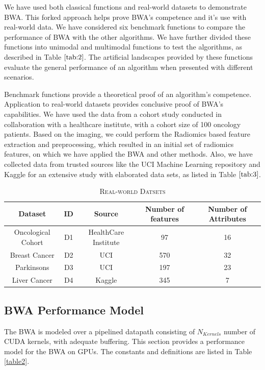 \documentclass[conference]{IEEEtran}
\begin{document}
We have used both classical functions and real-world datasets to demonstrate BWA. This forked approach helps prove BWA's competence and it's use with real-world data. We have considered six benchmark functions to compare the performance of BWA with the other algorithms. We have further divided these functions into unimodal and multimodal functions to test the algorithms, as described in Table $\ref{tab:2}$. The artificial landscapes provided by these functions evaluate the general performance of an algorithm when presented with different scenarios. 



Benchmark functions provide a theoretical proof of an algorithm's competence. Application to real-world datasets provides conclusive proof of BWA's capabilities. We have used the data from a cohort study conducted in collaboration with a healthcare institute, with a cohort size of 100 oncology patients. Based on the imaging, we could perform the Radiomics based feature extraction and preprocessing, which resulted in an initial set of radiomics features, on which we have applied the BWA and other methods. Also, we have collected data from trusted sources like the UCI Machine Learning repository and Kaggle for an extensive study with elaborated data sets, as listed in Table $\ref{tab:3}$. 

\begin{table}[t]
\caption{\textsc{Real-world Datsets}}
\label{tab:3}
\centering
\scalebox{0.75}
{
\begin{tabular}{ | c | c | c | c | c |}
\hline  
Dataset & ID & Source & Number of features & Number of Attributes\\
\hline
Oncological Cohort & D1 & HealthCare Institute& 97 & 16\\
Breast Cancer & D2 & UCI & 570 & 32\\
Parkinsons & D3 & UCI & 197 & 23\\
Liver Cancer& D4 & Kaggle & 345 & 7\\
\hline
\end{tabular}
}
\end{table}

\subsection{BWA Performance Model}

The BWA is modeled over a pipelined datapath consisting of $N_{Kernels}$ number of CUDA kernels, with adequate buffering. This section provides a performance model for the BWA on GPUs. The constants and definitions are listed in Table \ref{table2}.
\end{document}
